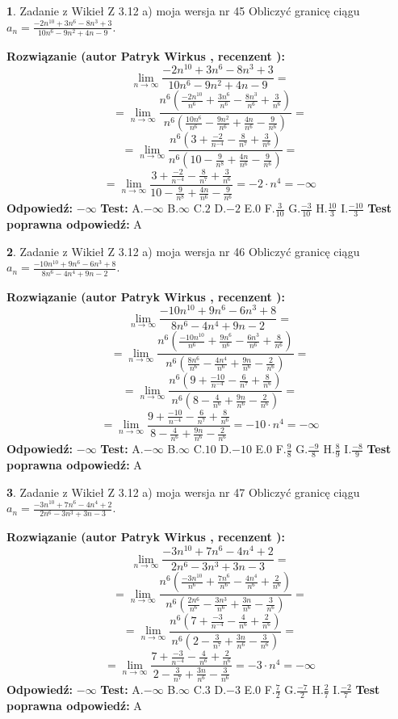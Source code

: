 \documentclass[12pt, a4paper]{article}
\theoremstyle{definition} %
\newtheorem{zad}{}
\newcommand{\zadStart}[1]{\begin{zad}#1\newline}
\newcommand{\zadStop}{\end{zad}}
\newcommand{\rozwStart}[2]{\noindent \textbf{Rozwiązanie (autor #1 , recenzent #2): }\newline}
\newcommand{\rozwStop}{\newline}
\newcommand{\odpStart}{\noindent \textbf{Odpowiedź:}\newline}
\newcommand{\odpStop}{\newline}
\newcommand{\testStart}{\noindent \textbf{Test:}\newline}
\newcommand{\testStop}{\newline}
\newcommand{\kluczStart}{\noindent \textbf{Test poprawna odpowiedź:}\newline}
\newcommand{\kluczStop}{\newline}
\begin{document}
\zadStart{Zadanie z Wikieł Z 3.12 a) moja wersja nr 45}
Obliczyć granicę ciągu $a_{n}=\frac{-2n^{10}+3n^{6}-8n^{3}+3}{10n^{6}-9n^{2}+4n-9}$.
\zadStop
\rozwStart{Patryk Wirkus}{}
$$\lim\limits_{n\to\infty}\frac{-2n^{10}+3n^{6}-8n^{3}+3}{10n^{6}-9n^{2}+4n-9}=$$
$$=\lim\limits_{n\to\infty}\frac{n^{6}\left(\frac{-2n^{10}}{n^{6}}+\frac{3n^{6}}{n^{6}}-\frac{8n^{3}}{n^{6}}+\frac{3}{n^{6}}\right)}{n^{6}\left(\frac{10n^{6}}{n^{6}}-\frac{9n^{2}}{n^{6}}+\frac{4n}{n^{6}}-\frac{9}{n^{6}}\right)}=$$
$$=\lim\limits_{n\to\infty}\frac{n^{6}\left(3+\frac{-2}{n^{-4}}-\frac{8}{n^{7}}+\frac{3}{n^{6}}\right)}
{n^{6}\left(10-\frac{9}{n^{8}}+\frac{4n}{n^{6}}-\frac{9}{n^{6}}\right)}=$$
$$=\lim\limits_{n\to\infty}\frac{3+\frac{-2}{n^{-4}}-\frac{8}{n^{7}}+\frac{3}{n^{6}}}{10-\frac{9}{n^{8}}+\frac{4n}{n^{6}}-\frac{9}{n^{6}}}=-2\cdot n^{4} = -\infty$$
\rozwStop
\odpStart
$-\infty$
\odpStop
\testStart
A.$-\infty$
B.$\infty$
C.$2$
D.$-2$
E.$0$
F.$\frac{3}{10}$
G.$\frac{-3}{10}$
H.$\frac{10}{3}$
I.$\frac{-10}{3}$
\testStop
\kluczStart
A
\kluczStop



\zadStart{Zadanie z Wikieł Z 3.12 a) moja wersja nr 46}
Obliczyć granicę ciągu $a_{n}=\frac{-10n^{10}+9n^{6}-6n^{3}+8}{8n^{6}-4n^{4}+9n-2}$.
\zadStop
\rozwStart{Patryk Wirkus}{}
$$\lim\limits_{n\to\infty}\frac{-10n^{10}+9n^{6}-6n^{3}+8}{8n^{6}-4n^{4}+9n-2}=$$
$$=\lim\limits_{n\to\infty}\frac{n^{6}\left(\frac{-10n^{10}}{n^{6}}+\frac{9n^{6}}{n^{6}}-\frac{6n^{3}}{n^{6}}+\frac{8}{n^{6}}\right)}{n^{6}\left(\frac{8n^{6}}{n^{6}}-\frac{4n^{4}}{n^{6}}+\frac{9n}{n^{6}}-\frac{2}{n^{6}}\right)}=$$
$$=\lim\limits_{n\to\infty}\frac{n^{6}\left(9+\frac{-10}{n^{-4}}-\frac{6}{n^{7}}+\frac{8}{n^{6}}\right)}
{n^{6}\left(8-\frac{4}{n^{6}}+\frac{9n}{n^{6}}-\frac{2}{n^{6}}\right)}=$$
$$=\lim\limits_{n\to\infty}\frac{9+\frac{-10}{n^{-4}}-\frac{6}{n^{7}}+\frac{8}{n^{6}}}{8-\frac{4}{n^{6}}+\frac{9n}{n^{6}}-\frac{2}{n^{6}}}=-10\cdot n^{4} = -\infty$$
\rozwStop
\odpStart
$-\infty$
\odpStop
\testStart
A.$-\infty$
B.$\infty$
C.$10$
D.$-10$
E.$0$
F.$\frac{9}{8}$
G.$\frac{-9}{8}$
H.$\frac{8}{9}$
I.$\frac{-8}{9}$
\testStop
\kluczStart
A
\kluczStop



\zadStart{Zadanie z Wikieł Z 3.12 a) moja wersja nr 47}
Obliczyć granicę ciągu $a_{n}=\frac{-3n^{10}+7n^{6}-4n^{4}+2}{2n^{6}-3n^{3}+3n-3}$.
\zadStop
\rozwStart{Patryk Wirkus}{}
$$\lim\limits_{n\to\infty}\frac{-3n^{10}+7n^{6}-4n^{4}+2}{2n^{6}-3n^{3}+3n-3}=$$
$$=\lim\limits_{n\to\infty}\frac{n^{6}\left(\frac{-3n^{10}}{n^{6}}+\frac{7n^{6}}{n^{6}}-\frac{4n^{4}}{n^{6}}+\frac{2}{n^{6}}\right)}{n^{6}\left(\frac{2n^{6}}{n^{6}}-\frac{3n^{3}}{n^{6}}+\frac{3n}{n^{6}}-\frac{3}{n^{6}}\right)}=$$
$$=\lim\limits_{n\to\infty}\frac{n^{6}\left(7+\frac{-3}{n^{-4}}-\frac{4}{n^{6}}+\frac{2}{n^{6}}\right)}
{n^{6}\left(2-\frac{3}{n^{7}}+\frac{3n}{n^{6}}-\frac{3}{n^{6}}\right)}=$$
$$=\lim\limits_{n\to\infty}\frac{7+\frac{-3}{n^{-4}}-\frac{4}{n^{6}}+\frac{2}{n^{6}}}{2-\frac{3}{n^{7}}+\frac{3n}{n^{6}}-\frac{3}{n^{6}}}=-3\cdot n^{4} = -\infty$$
\rozwStop
\odpStart
$-\infty$
\odpStop
\testStart
A.$-\infty$
B.$\infty$
C.$3$
D.$-3$
E.$0$
F.$\frac{7}{2}$
G.$\frac{-7}{2}$
H.$\frac{2}{7}$
I.$\frac{-2}{7}$
\testStop
\kluczStart
A
\kluczStop
\end{document}
